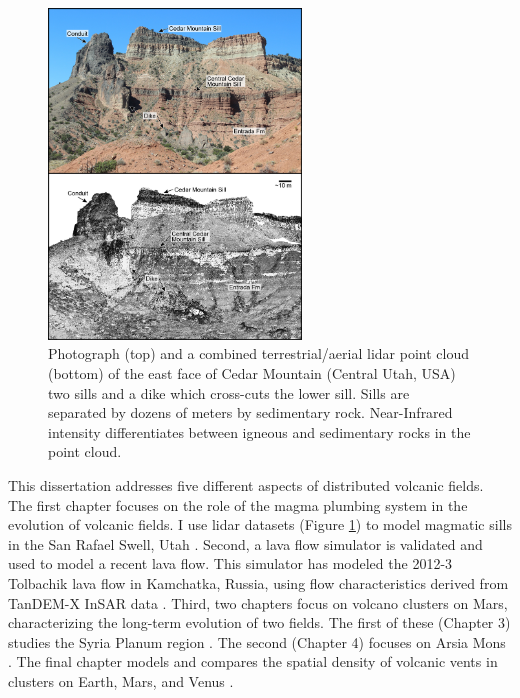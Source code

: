\begin{figure}[hb!]
\centering
\includegraphics[width=0.6\textwidth]{figures/chapter-sills/SFig2-photo_pcloud}
\caption{Photograph (top) and a combined terrestrial/aerial lidar point cloud (bottom) of the east face of Cedar Mountain (Central Utah, USA) two sills and a dike which cross-cuts the lower sill. Sills are separated by dozens of meters by sedimentary rock. Near-Infrared intensity differentiates between igneous and sedimentary rocks in the point cloud.}
\label{fig_photo-pcloud}
\end{figure}

This dissertation addresses five different aspects of distributed volcanic fields. The first chapter focuses on the role of the magma plumbing system in the evolution of volcanic fields. I use lidar datasets (Figure \ref{fig_photo-pcloud}) to model magmatic sills in the San Rafael Swell, Utah \citep{richardson2015sills}. Second, a lava flow simulator is validated and used to model a recent lava flow. This simulator has modeled the 2012-3 Tolbachik lava flow in Kamchatka, Russia, using flow characteristics derived from TanDEM-X InSAR data \citep{kubanek2015lava}. Third, two chapters focus on volcano clusters on Mars, characterizing the long-term evolution of two fields. The first of these (Chapter 3) studies the Syria Planum region \citep{richardson2013volcanic}. The second (Chapter 4) focuses on Arsia Mons \citep{richardson2015recurrence}. The final chapter models and compares the spatial density of volcanic vents in clusters on Earth, Mars, and Venus \citep{richardson2012comparison}.


